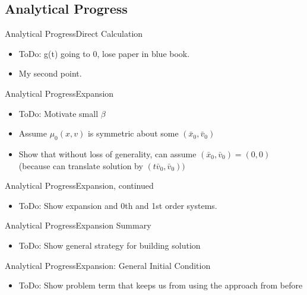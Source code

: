 \documentclass{beamer}
\begin{document}
\subsection{Analytical Progress}

\begin{frame}{Analytical Progress}{Direct Calculation}
	\begin{itemize}
		\item {
			ToDo: g(t) going to 0, lose paper in blue book.
		}
		\item {
			My second point.
		}
	\end{itemize}
\end{frame}

\begin{frame}{Analytical Progress}{Expansion}
	\begin{itemize}
		\item {
			ToDo: Motivate small $\beta$
		}
		\item {
			Assume $\mu_0(x,v)$ is symmetric about some $(\bar x_0,\bar v_0)$
		}
		\item {
			Show that without loss of generality, can assume $(\bar x_0,\bar v_0)=(0,0)$ (because can translate solution by $(t\bar v_0,\bar v_0))$
		}
	\end{itemize}
\end{frame}

\begin{frame}{Analytical Progress}{Expansion, continued}
	\begin{itemize}
		\item {
			ToDo: Show expansion and 0th and 1st order systems.
		}
	\end{itemize}
\end{frame}

\begin{frame}{Analytical Progress}{Expansion Summary}
	\begin{itemize}
		\item {
			ToDo: Show general strategy for building solution
		}
	\end{itemize}
\end{frame}

\begin{frame}{Analytical Progress}{Expansion: General Initial Condition}
	\begin{itemize}
		\item {
			ToDo: Show problem term that keeps us from using the approach from before
		}
	\end{itemize}
\end{frame}
\end{document}
